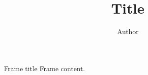 \documentclass{beamer}
\title{Title}\author{Author}
\begin{document}
\frame{\titlepage}
\begin{frame}{Frame title}
    Frame content.
\end{frame}
\end{document}
